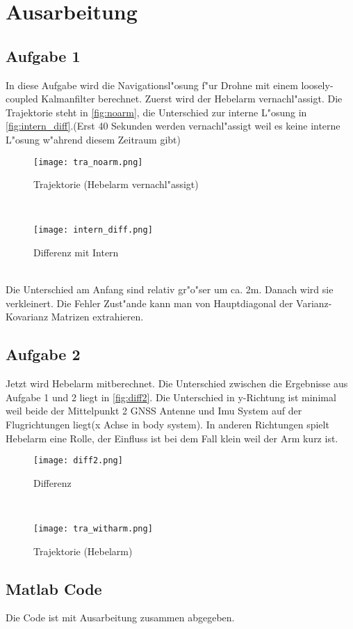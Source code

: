 \chapter{Ausarbeitung}
\section{Aufgabe 1}
In diese Aufgabe wird die Navigationsl"osung f"ur Drohne mit einem loosely-coupled Kalmanfilter berechnet. Zuerst wird der Hebelarm vernachl"assigt. Die Trajektorie steht in \autoref{fig:noarm}, die Unterschied zur interne L"osung in \autoref{fig:intern_diff}.(Erst 40 Sekunden werden vernachl"assigt weil es keine interne L"osung w"ahrend diesem Zeitraum gibt)
\begin{figure}[htpb]\centering
		\texttt{[image: tra\_noarm.png]}
		\caption{Trajektorie (Hebelarm vernachl"assigt)}
		\label{fig:noarm}
\end{figure}\\
\begin{figure}[htpb]\centering
	\texttt{[image: intern\_diff.png]}
	\caption{Differenz mit Intern}
	\label{fig:intern_diff}
\end{figure}\\
Die Unterschied am Anfang sind relativ gr"o"ser um ca. 2m. Danach wird sie verkleinert. Die Fehler Zust"ande kann man von Hauptdiagonal der Varianz-Kovarianz Matrizen extrahieren. 
\clearpage
\section{Aufgabe 2}
Jetzt wird Hebelarm mitberechnet. Die Unterschied zwischen die Ergebnisse aus Aufgabe 1 und 2 liegt in \autoref{fig:diff2}. Die Unterschied in y-Richtung ist minimal weil beide der Mittelpunkt 2 GNSS Antenne und Imu System auf der Flugrichtungen liegt(x Achse in body system). In anderen Richtungen spielt Hebelarm eine Rolle, der Einfluss ist bei dem Fall klein weil der Arm kurz ist.
\begin{figure}[htpb]\centering
	\texttt{[image: diff2.png]}
	\caption{Differenz}
	\label{fig:diff2}
\end{figure}\\
\begin{figure}[htpb]\centering
	\texttt{[image: tra\_witharm.png]}
	\caption{Trajektorie (Hebelarm)}
	\label{fig:arm}
\end{figure}
\clearpage
{}
\section{Matlab Code}
Die Code ist mit Ausarbeitung zusammen abgegeben.
